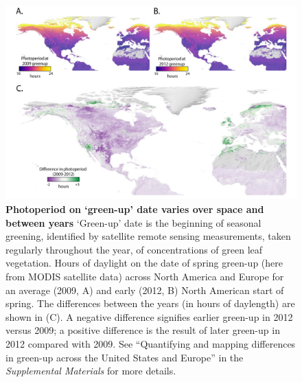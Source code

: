\documentclass{article}
\begin{document}
 \begin{figure}[h]
\centering
\includegraphics{..//..//docs/photoperiod/figures/Greenup_corr_sm_leg.pdf} %
\caption{\textbf{Photoperiod on `green-up' date varies over space and between years} `Green-up' date is the beginning of seasonal greening, identified by satellite remote sensing measurements, taken regularly throughout the year, of concentrations of green leaf vegetation. Hours of daylight on the date of spring green-up (here from MODIS satellite data) across North America and Europe for an average (2009, A) and early (2012, B) North American start of spring. The differences between the years (in hours of daylength) are shown in (C). A negative difference signifies earlier green-up in 2012 versus 2009; a positive difference is the result of later green-up in 2012 compared with 2009. See ``Quantifying and mapping differences in green-up across the United States and Europe'' in the \emph{Supplemental Materials} for more details. }%
 \label{fig:greenup}%
 \end{figure}
\end{document}
